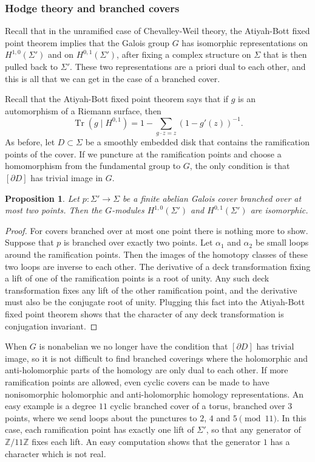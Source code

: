 \documentclass[11pt]{amsart}
\newtheorem{prop}[thm]{Proposition}
\numberwithin{thm}{section}
\begin{document}
\subsubsection{Hodge theory and branched covers}
Recall that in the unramified case of Chevalley-Weil theory, the Atiyah-Bott fixed point theorem implies that the Galois group $G$ has isomorphic representations on $H^{1,0}(\Sigma')$ and on $H^{0,1}(\Sigma')$, after fixing a complex structure on $\Sigma$ that is then pulled back to $\Sigma'$.  These two representations are a priori dual to each other, and this is all that we can get in the case of a branched cover.

Recall that the Atiyah-Bott fixed point theorem says that if $g$ is an automorphism of a Riemann surface, then \[{\operatorname{Tr}}(g\mid H^{0,1})=1-\sum_{g\cdot z=z} (1-g'(z))^{-1}.\]  As before, let $D\subset\Sigma$ be a smoothly embedded disk that contains the ramification points of the cover.  If we puncture at the ramification points and choose a homomorphism from the fundamental group to $G$, the only condition is that $[\partial D]$ has trivial image in $G$.

\begin{prop}
Let $p:\Sigma'\to\Sigma$ be a finite abelian Galois cover branched over at most two points.  Then the $G$-modules $H^{1,0}(\Sigma')$ and $H^{0,1}(\Sigma')$ are isomorphic.
\end{prop}
\begin{proof}
For covers branched over at most one point there is nothing more to show.  Suppose that $p$ is branched over exactly two points.  Let $\alpha_1$ and $\alpha_2$ be small loops around the ramification points.  Then the images of the homotopy classes of these two loops are inverse to each other.  The derivative of a deck transformation fixing a lift of one of the ramification points is a root of unity.  Any such deck transformation fixes any lift of the other ramification point, and the derivative must also be the conjugate root of unity.  Plugging this fact into the Atiyah-Bott fixed point theorem shows that the character of any deck transformation is conjugation invariant.
\end{proof}

When $G$ is nonabelian we no longer have the condition that $[\partial D]$ has trivial image, so it is not difficult to find branched coverings where the holomorphic and anti-holomorphic parts of the homology are only dual to each other.  If more ramification points are allowed, even cyclic covers can be made to have nonisomorphic holomorphic and anti-holomorphic homology representations.  An easy example is a degree $11$ cyclic branched cover of a torus, branched over $3$ points, where we send loops about the punctures to $2$, $4$ and $5\pmod{11}$.  In this case, each ramification point has exactly one lift of $\Sigma'$, so that any generator of ${\mathbb{Z}}/11{\mathbb{Z}}$ fixes each lift.  An easy computation shows that the generator $1$ has a character which is not real.
\end{document}
